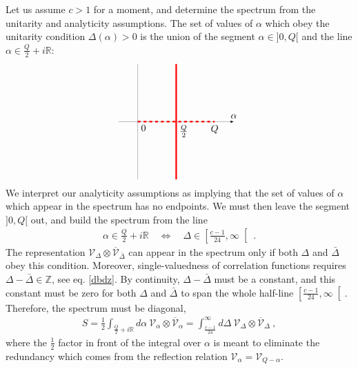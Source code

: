 \documentclass[12pt, a4paper, notitlepage, twoside]{report}
\numberwithin{equation}{section}
\theoremstyle{break}
\begin{document}
Let us assume $c>1$ for a moment, and determine the spectrum from the unitarity and analyticity assumptions. 
The set of values of $\alpha$ which obey the unitarity condition $\Delta(\alpha)> 0$ is the union of the segment $\alpha\in]0,Q[$ and the line $\alpha \in \frac{Q}{2}+i{\mathbb{R}}$:
\begin{align}
 \begin{tikzpicture}[scale = .7, baseline=(current  bounding  box.center)]
  \draw[-latex, very thin] (-1, 0) -- (0, 0) node[below right] {$0$} -- (2, 0) node[below right] {$\frac{Q}{2}$} -- (4, 0) node [below] {$Q$} -- (5, 0) node[above] {$\alpha$};
  \draw[red, ultra thick, dashed] (0, 0) -- (4, 0);
  \draw[red, ultra thick] (2, -3) -- (2, 3);
  \draw[very thin] (0, -3) -- (0, 3);
 \end{tikzpicture}
\end{align}
We interpret our analyticity assumptions as implying that the set of values of $\alpha$ which appear in the spectrum has no endpoints. 
We must then leave the segment $]0,Q[$ out, and build the spectrum from the line
\begin{align}
 \alpha \in \frac{Q}{2}+i{\mathbb{R}} \quad \Leftrightarrow \quad \Delta \in \left[\frac{c-1}{24},\infty\right[\ .
\label{aqd}
\end{align}
The representation $\mathcal{V}_\Delta\otimes \overline{\mathcal{V}}_{\bar{\Delta}}$ can appear in the spectrum only if both 
$\Delta$ and $\bar{\Delta}$ obey this condition. 
Moreover, single-valuedness of correlation functions requires $\Delta-\bar{\Delta}\in {\mathbb{Z}} $, see eq. \eqref{dbdz}.
By continuity, $\Delta-\bar{\Delta}$ must be a constant, and this constant must be zero for both $\Delta$ and $\bar{\Delta}$ to span the whole half-line $\left[\frac{c-1}{24},\infty\right[$.
Therefore, the spectrum must be diagonal,
\begin{align}
 \boxed{ S= \frac12\int_{\frac{Q}{2}+i{\mathbb{R}}} d\alpha\ \mathcal{V}_\alpha \otimes \overline{\mathcal{V}}_\alpha = \int_{\frac{c-1}{24}}^\infty d\Delta\ \mathcal{V}_\Delta\otimes \overline{\mathcal{V}}_\Delta} \ ,
\label{sad}
\end{align}
where the $\frac12$ factor in front of the integral over $\alpha$ is meant to eliminate the redundancy which comes from the reflection relation $\mathcal{V}_\alpha=\mathcal{V}_{Q-\alpha}$. 
\end{document}

